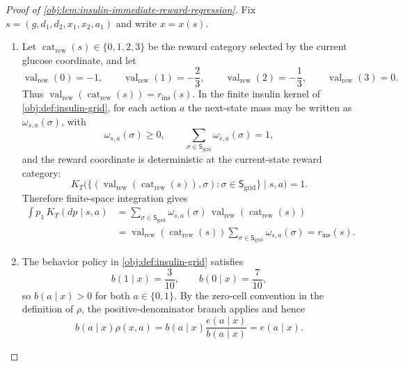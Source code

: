 \documentclass[11pt]{article}
\begin{document}
\begin{proof}[Proof of \cref{obj:lem:insulin-immediate-reward-regression}]
Fix \(s=(g,d_1,d_2,x_1,x_2,a_1)\) and write \(x=x(s)\).

\begin{enumerate}
\item Let \(\operatorname{cat}_{\mathrm{rew}}(s)\in\{0,1,2,3\}\) be the reward category selected by the current glucose coordinate, and let
\[
\operatorname{val}_{\mathrm{rew}}(0)=-1,\qquad
\operatorname{val}_{\mathrm{rew}}(1)=-\frac23,\qquad
\operatorname{val}_{\mathrm{rew}}(2)=-\frac13,\qquad
\operatorname{val}_{\mathrm{rew}}(3)=0 .
\]
Thus \(\operatorname{val}_{\mathrm{rew}}(\operatorname{cat}_{\mathrm{rew}}(s))=r_{\mathrm{ins}}(s)\). In the finite insulin kernel of \cref{obj:def:insulin-grid}, for each action \(a\) the next-state mass may be written as \(\omega_{s,a}(\sigma)\), with
\[
\omega_{s,a}(\sigma)\ge 0,
\qquad
\sum_{\sigma\in\mathsf S_{\mathrm{grid}}}\omega_{s,a}(\sigma)=1,
\]
and the reward coordinate is deterministic at the current-state reward category:
\[
K_T\bigl(\{(\operatorname{val}_{\mathrm{rew}}(\operatorname{cat}_{\mathrm{rew}}(s)),\sigma):
\sigma\in\mathsf S_{\mathrm{grid}}\}\mid s,a\bigr)=1 .
\]
Therefore finite-space integration gives
\[
\begin{aligned}
\int p_1\,K_T(dp\mid s,a)
&=
\sum_{\sigma\in\mathsf S_{\mathrm{grid}}}
\omega_{s,a}(\sigma)\,
\operatorname{val}_{\mathrm{rew}}(\operatorname{cat}_{\mathrm{rew}}(s))  \\
&=
\operatorname{val}_{\mathrm{rew}}(\operatorname{cat}_{\mathrm{rew}}(s))
\sum_{\sigma\in\mathsf S_{\mathrm{grid}}}\omega_{s,a}(\sigma)
=
r_{\mathrm{ins}}(s).
\end{aligned}
\]

\item The behavior policy in \cref{obj:def:insulin-grid} satisfies
\[
b(1\mid x)=\frac{3}{10},
\qquad
b(0\mid x)=\frac{7}{10},
\]
so \(b(a\mid x)>0\) for both \(a\in\{0,1\}\). By the zero-cell convention in the definition of \(\rho\), the positive-denominator branch applies and hence
\[
b(a\mid x)\rho(x,a)
=
b(a\mid x)\frac{e(a\mid x)}{b(a\mid x)}
=
e(a\mid x).
\]


\end{enumerate}
\end{proof}
\end{document}
